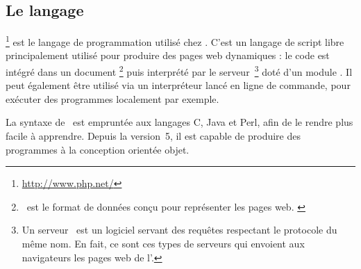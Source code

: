 \subsection{Le langage \aphp}

\aphp\footnote{\url{http://www.php.net/}} est le langage de programmation utilisé chez \asl. C'est un langage de script libre principalement utilisé pour produire des pages web dynamiques : le code est intégré dans un document \ahtml\footnote{\ahtml\ est le format de données conçu pour représenter les pages web. \cite{html}} puis interprété par le serveur~\ahttp\footnote{Un serveur \ahttp\ est un logiciel servant des requêtes respectant le protocole du même nom. \cite{serveurhttp} En fait, ce sont ces types de serveurs qui envoient aux navigateurs les pages web de l'\ainternet.} doté d'un module \aphp. Il peut également être utilisé via un interpréteur lancé en ligne de commande, pour exécuter des programmes localement par exemple.

La syntaxe de \aphp\ est empruntée aux langages C, Java et Perl, afin de le rendre plus facile à apprendre. Depuis la version~5, il est capable de produire des programmes à la conception orientée objet.
